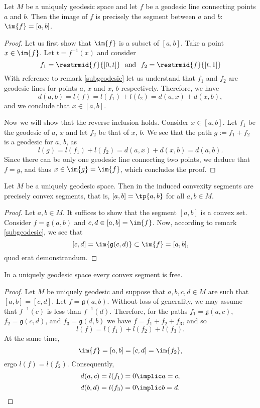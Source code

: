 \documentclass[12pt, a4paper]{article}
\newcommand{\g}{\mathfrak{g}}
\begin{document}
\begin{lemma}\label{unigeo-1}
    Let \(M\) be a uniquely geodesic space and let \(f\) be a geodesic line connecting points \(a\) and \(b\). Then the image of \(f\) is precisely the segment between \(a\) and \(b\): \(\im{f} = [a, b]\).
\end{lemma}
\begin{proof}
    Let us first show that \(\im{f}\) is a subset of \([a, b]\). Take a point \(x \in \im{f}\). Let \(t = f^{-1}(x)\) and consider \[f_1 = \restrmid{f}{[0, t]} \ \mbox{    and    } \ f_2 = \restrmid{f}{[t, 1]}\] With reference to remark \ref{subgeodesic} let us understand that \(f_1\) and \(f_2\) are geodesic lines for points \(a\), \(x\) and \(x\), \(b\) respectively. Therefore, we have \[d(a, b) = l(f) = l(f_1) + l(l_2) = d(a, x) + d(x, b),\] and we conclude that \(x \in [a, b]\).

    Now we will show that the reverse inclusion holds. Consider \(x \in [a, b]\). Let \(f_1\) be the geodesic of \(a\), \(x\) and let \(f_2\) be that of \(x\), \(b\). We see that the path \(g := f_1+f_2\) is a geodesic for \(a\), \(b\), as \[l(g) = l(f_1) + l(f_2) = d(a, x) + d(x, b) = d(a, b).\] Since there can be only one geodesic line connecting two points, we deduce that \(f = g\), and thus \(x \in \im{g} = \im{f}\), which concludes the proof.
\end{proof}

\begin{lemma}\label{unigeo-2}
    Let \(M\) be a uniquely geodesic space. Then in the induced convexity segments are precisely convex segments, that is, \([a, b] = \tp{a, b}\) for all \(a, b \in M\).
\end{lemma}
\begin{proof}
    Let \(a, b \in M\). It suffices to show that the segment \([a, b]\) is a convex set. Consider \(f = \g(a,b)\) and \(c, d \in [a, b] = \im{f}\). Now, according to remark \ref{subgeodesic}, we see that \[[c, d] = \im{\g(c, d)} \subset \im{f} = [a, b],\] quod erat demonstrandum.
\end{proof}

\begin{lemma}\label{unigeo-3}
    In a uniquely geodesic space every convex segment is free.
\end{lemma}
\begin{proof}
    Let \(M\) be uniquely geodesic and suppose that \(a, b, c, d \in M\) are such that \([a, b] = [c, d]\). Let \(f = \g(a, b)\). Without loss of generality, we may assume that \(f^{-1}(c)\) is less than \(f^{-1}(d)\). Therefore, for the paths \(f_1 = \g(a, c)\), \(f_2 = \g(c, d)\), and \(f_3 = \g(d, b)\) we have \(f = f_1 + f_2 + f_3\), and so \[l(f) = l(f_1) + l(f_2) + l(f_3).\] At the same time, \[\im{f} = [a, b] = [c, d] = \im{f_2},\] ergo \(l(f) = l(f_2)\). Consequently, \[d(a, c) = l(f_1) = 0 \implic a = c,\] \[d(b, d) = l(f_3) = 0 \implic b = d.\] 
\end{proof}
\end{document}
